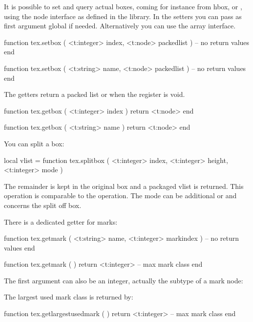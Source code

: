 \stopsubsection

\startsubsection[title={Box registers}]

It is possible to set and query actual boxes, coming for instance from \prm
{hbox},  or , using the node interface as defined in the
 library. In the setters you can pass as first argument \type
{global} if needed. Alternatively you can use the  array
interface.

\starttyping[option=LUA]
function tex.setbox (
    <t:integer> index,
    <t:node>    packedlist
)
    -- no return values
end

function tex.setbox (
    <t:string> name,
    <t:node>   packedlist
)
    -- no return values
end
\stoptyping

The getters return a packed list or  when the register is void.

\starttyping[option=LUA]
function tex.getbox (
    <t:integer> index
)
    return <t:node>
end

function tex.getbox (
    <t:string> name
)
    return <t:node>
end
\stoptyping

You can split a box:

\starttyping[option=LUA]
local vlist =
function tex.splitbox (
    <t:integer> index,
    <t:integer> height,
    <t:integer> mode
)
\stoptyping

The remainder is kept in the original box and a packaged vlist is returned. This
operation is comparable to the \type {\vsplit} operation. The mode can be \type
{additional} or  and concerns the split off box.

\stopsubsection

\startsubsection[title=Marks]

There is a dedicated getter for marks:

\starttyping[option=LUA]
function tex.getmark (
    <t:string>  name,
    <t:integer> markindex
)
    -- no return values
end

function tex.getmark ( )
    return <t:integer> -- max mark class
end
\stoptyping

The first argument can also be an integer, actually the subtype of a mark node:

\starttworows
{}
\stoptworows

The largest used mark class is returned by:

\starttyping[option=LUA]
function tex.getlargestusedmark ( )
    return <t:integer> -- max mark class
end
\stoptyping

